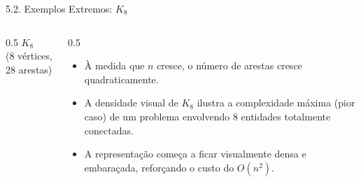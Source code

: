\documentclass[9pt]{beamer}
\begin{document}
    \begin{frame}{5.2. Exemplos Extremos: $K_8$}
        \begin{columns}
            \begin{column}{0.5\textwidth}
                \centering
                \textbf{$K_8$}\\
                (8 vértices, 28 arestas)\\
                \vspace{0.5cm}
            \end{column}
            \begin{column}{0.5\textwidth}
                \begin{itemize}
                    \item À medida que $n$ cresce, o número de arestas cresce quadraticamente.
                    \item A densidade visual de $K_8$ ilustra a complexidade máxima (pior caso) de um problema envolvendo 8 entidades totalmente conectadas.
                    \item A representação começa a ficar visualmente densa e embaraçada, reforçando o custo do $O(n^2)$.
                \end{itemize}
            \end{column}
        \end{columns}
    \end{frame}
\end{document}
